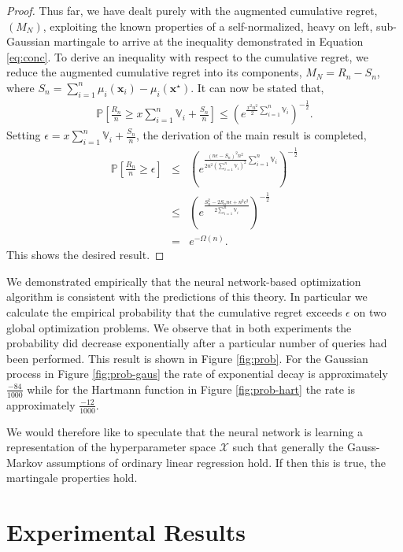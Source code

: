 \documentclass[]{article}
\newcommand{\paren}[1]{\left({#1}\right)}
\newcommand{\brac}[1]{\left[{#1}\right]}
\renewcommand{\Pr}[1]{\mathbb{P}\brac{{#1}}}
\newcommand{\1}{\mathbf{1}}
\newcommand{\0}{\mathbf{0}}
\newcommand{\X}{\mathcal{X}}
\newcommand{\x}{\mathbf{x}}
\begin{document}
\begin{proof}
	Thus far, we have dealt purely with the augmented cumulative regret, $(M_N)$, exploiting the known properties of a self-normalized, heavy on left, sub-Gaussian martingale to arrive at the inequality demonstrated in Equation \ref{eq:conc}. To derive an inequality with respect to the cumulative regret, we reduce the augmented cumulative regret into its components, $M_N = R_n - S_n$, where $S_n = \sum_{i=1}^n \mu_i(\x_i) - \mu_i(\x^\star)$. It can now be stated that,
  	\begin{eqnarray}
    	\Pr{\frac{R_n}{n} \geq x\sum_{i=1}^n \mathbb{V}_i + \frac{S_n}{n}} \leq \paren{e^{\frac{x^2n^2}{2}\sum_{i=1}^n \mathbb{V}_i}}^{-\frac{1}{2}}.
  	\end{eqnarray}
	Setting $\epsilon = x \sum_{i=1}^n \mathbb{V}_i + \frac{S_n}{n}$, the derivation of the main result is completed,
  	\begin{eqnarray}
      	\Pr{\frac{R_n}{n} \geq \epsilon} &\leq&
      	\paren{e^{\frac{(n\epsilon-S_n)^2n^2}{2n^2 (\sum_{i=1}^n \mathbb{V}_i)^2 }\sum_{i=1}^n \mathbb{V}_i}}^{-\frac{1}{2}} \\
      	&\leq&
      	\paren{e^{\frac{S_n^2 - 2S_n n \epsilon + n^2\epsilon^2}{2 \sum_{i=1}^n \mathbb{V}_i }}}^{-\frac{1}{2}} \\
      	&=& e^{-\Omega(n)}.
  	\end{eqnarray}
  	This shows the desired result.
\end{proof}

We demonstrated empirically that the neural network-based optimization algorithm is consistent with the predictions of this theory. In particular we calculate the empirical probability that the cumulative regret exceeds $\epsilon$ on two global optimization problems. We observe that in both experiments the probability did decrease exponentially after a particular number of queries had been performed. This result is shown in Figure \ref{fig:prob}. For the Gaussian process in Figure \ref{fig:prob-gaus} the rate of exponential decay is approximately $\frac{-84}{1000}$ while for the Hartmann function in Figure \ref{fig:prob-hart} the rate is approximately $\frac{-12}{1000}$. 

We would therefore like to speculate that the neural network is learning a representation of the hyperparameter space $\X$ such that generally the Gauss-Markov assumptions of ordinary linear regression hold. If then this is true, the martingale properties hold.


\section{Experimental Results}
\label{sec:expe-resu}
\end{document}

